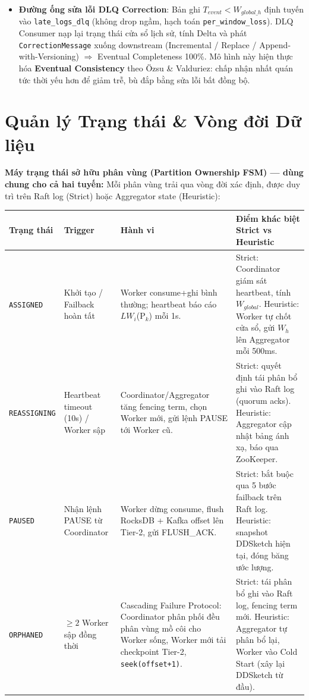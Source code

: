 \documentclass[9pt,a4paper]{article}
\begin{document}
\begin{itemize}[leftmargin=*]
    \item \textbf{Đường ống sửa lỗi DLQ Correction}: Bản ghi $T_{event}<W_{global\_h}$ định tuyến vào \texttt{late\_logs\_dlq} (không drop ngầm, hạch toán \texttt{per\_window\_loss}). DLQ Consumer nạp lại trạng thái cửa sổ lịch sử, tính Delta và phát \texttt{CorrectionMessage} xuống downstream (Incremental / Replace / Append-with-Versioning) $\Rightarrow$ Eventual Completeness 100\%. Mô hình này hiện thực hóa \textbf{Eventual Consistency} theo Özsu \& Valduriez: chấp nhận nhất quán tức thời yếu hơn để giảm trễ, bù đắp bằng sửa lỗi bất đồng bộ.
\end{itemize}

\section{Quản lý Trạng thái \& Vòng đời Dữ liệu}
\textbf{Máy trạng thái sở hữu phân vùng (Partition Ownership FSM) --- dùng chung cho cả hai tuyến:} Mỗi phân vùng trải qua vòng đời xác định, được duy trì trên Raft log (Strict) hoặc Aggregator state (Heuristic):

\begin{center}
\small
\setlength{\tabcolsep}{3pt}
\begin{tabular}{@{}>{\raggedright\arraybackslash}p{2.0cm}>{\raggedright\arraybackslash}p{2.7cm}>{\raggedright\arraybackslash}p{5.2cm}>{\raggedright\arraybackslash}p{5.2cm}@{}}
\toprule
\textbf{Trạng thái} & \textbf{Trigger} & \textbf{Hành vi} & \textbf{Điểm khác biệt Strict vs Heuristic} \\
\midrule
\texttt{ASSIGNED} & Khởi tạo / Failback hoàn tất & Worker consume+ghi bình thường; heartbeat báo cáo $LW_i$(P$_k$) mỗi 1s. & Strict: Coordinator giám sát heartbeat, tính $W_{global}$. Heuristic: Worker tự chốt cửa sổ, gửi $W_{h}$ lên Aggregator mỗi 500ms. \\
\midrule
\texttt{REASSIGNING} & Heartbeat timeout (10s) / Worker sập & Coordinator/Aggregator tăng fencing term, chọn Worker mới, gửi lệnh PAUSE tới Worker cũ. & Strict: quyết định tái phân bổ ghi vào Raft log (quorum acks). Heuristic: Aggregator cập nhật bảng ánh xạ, báo qua ZooKeeper. \\
\midrule
\texttt{PAUSED} & Nhận lệnh PAUSE từ Coordinator & Worker dừng consume, flush RocksDB + Kafka offset lên Tier-2, gửi FLUSH\_ACK. & Strict: bắt buộc qua 5 bước failback trên Raft log. Heuristic: snapshot DDSketch hiện tại, đóng băng ước lượng. \\
\midrule
\texttt{ORPHANED} & $\ge 2$ Worker sập đồng thời & Cascading Failure Protocol: Coordinator phân phối đều phân vùng mồ côi cho Worker sống, Worker mới tải checkpoint Tier-2, \texttt{seek(offset+1)}. & Strict: tái phân bổ ghi vào Raft log, fencing term mới. Heuristic: Aggregator tự phân bổ lại, Worker vào Cold Start (xây lại DDSketch từ đầu). \\
\bottomrule
\end{tabular}
\end{center}
\end{document}
